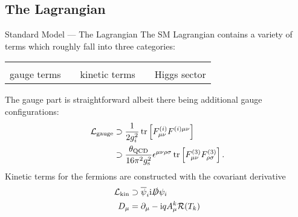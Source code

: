 \subsection{The Lagrangian}
\begin{frame}{Standard Model — The Lagrangian}
The SM Lagrangian contains a variety of terms which roughly fall into three categories:
\begin{table}
\begin{tabular}{ccccc}&&&&\\
  gauge terms&& kinetic terms&& Higgs sector
\end{tabular}
\end{table}

The gauge part is straightforward albeit there being additional gauge configurations:
\begin{align}
  \mathcal{L}_\text{gauge}&\supset\frac1{2g_i^2}\tr\left[F^{(i)}_{\mu\nu}F^{(i)\mu\nu}\right]\\
  &\supset\frac{\theta_\mathrm{QCD}}{16\pi^2g_\mathrm{s}^2}\epsilon^{\mu\nu\rho\sigma}\tr\left[F^{(3)}_{\mu\nu}F^{(3)}_{\rho\sigma}\right].
\end{align}
Kinetic terms for the fermions are constructed with the covariant derivative
\begin{align}
  \mathcal{L}_\mathrm{kin}&\supset\overline{\psi}_i\mathrm{i}\slashed{D}\psi_i\\
  D_\mu&=\partial_\mu-\mathrm{i} qA^k_\mu\mathcal{R}(T_k)
\end{align}
\end{frame}

